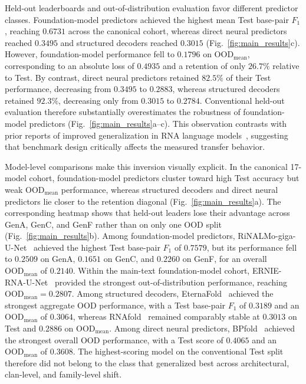 \documentclass[pdflatex,sn-mathphys-num]{sn-jnl}%
\theoremstyle{thmstyleone}%
\theoremstyle{thmstyletwo}%
\theoremstyle{thmstylethree}%
\begin{document}
Held-out leaderboards and out-of-distribution evaluation favor different predictor classes.
Foundation-model predictors achieved the highest mean Test base-pair $F_1$, reaching $0.6731$ across the canonical cohort, whereas direct neural predictors reached $0.3495$ and structured decoders reached $0.3015$ (Fig.~\ref{fig:main_results}c).
However, foundation-model performance fell to $0.1796$ on $\mathrm{OOD}_{\mathrm{mean}}$, corresponding to an absolute loss of $0.4935$ and a retention of only $26.7\%$ relative to Test.
By contrast, direct neural predictors retained $82.5\%$ of their Test performance, decreasing from $0.3495$ to $0.2883$, whereas structured decoders retained $92.3\%$, decreasing only from $0.3015$ to $0.2784$.
Conventional held-out evaluation therefore substantially overestimates the robustness of foundation-model predictors (Fig.~\ref{fig:main_results}a--c).
This observation contrasts with prior reports of improved generalization in RNA language models~\cite{penic2025rinalmo}, suggesting that benchmark design critically affects the measured transfer behavior.

Model-level comparisons make this inversion visually explicit.
In the canonical 17-model cohort, foundation-model predictors cluster toward high Test accuracy but weak $\mathrm{OOD}_{\mathrm{mean}}$ performance, whereas structured decoders and direct neural predictors lie closer to the retention diagonal (Fig.~\ref{fig:main_results}a).
The corresponding heatmap shows that held-out leaders lose their advantage across GenA, GenC, and GenF rather than on only one OOD split (Fig.~\ref{fig:main_results}b).
Among foundation-model predictors, RiNALMo-giga-U-Net~\cite{penic2025rinalmo} achieved the highest Test base-pair $F_1$ of $0.7579$, but its performance fell to $0.2509$ on GenA, $0.1651$ on GenC, and $0.2260$ on GenF, for an overall $\mathrm{OOD}_{\mathrm{mean}}$ of $0.2140$.
Within the main-text foundation-model cohort, ERNIE-RNA-U-Net~\cite{yin2025ernie} provided the strongest out-of-distribution performance, reaching $\mathrm{OOD}_{\mathrm{mean}} = 0.2807$.
Among structured decoders, EternaFold~\cite{waymentsteele2022rna} achieved the strongest aggregate OOD performance, with a Test base-pair $F_1$ of $0.3189$ and an $\mathrm{OOD}_{\mathrm{mean}}$ of $0.3064$, whereas RNAfold~\cite{lorenz2011viennarna} remained comparably stable at $0.3013$ on Test and $0.2886$ on $\mathrm{OOD}_{\mathrm{mean}}$.
Among direct neural predictors, BPfold~\cite{zhu2025deep} achieved the strongest overall OOD performance, with a Test score of $0.4065$ and an $\mathrm{OOD}_{\mathrm{mean}}$ of $0.3608$.
The highest-scoring model on the conventional Test split therefore did not belong to the class that generalized best across architectural, clan-level, and family-level shift.
\end{document}
